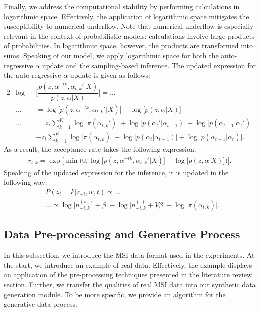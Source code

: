 \documentclass{mpaper}
\begin{document}
\par Finally, we address the computational stability by performing calculations in logarithmic space. Effectively, the application of logarithmic space mitigates the susceptibility to numerical underflow. Note that numerical underflow is especially relevant in the context of probabilistic models: calculations involve large products of probabilities. In logarithmic space, however, the products are transformed into sums. Speaking of our model, we apply logarithmic space for both the auto-regressive $\alpha$ update and the sampling-based inference. The updated expression for the auto-regressive $\alpha$ update is given as follows:
\begin{alignat*}{2}
  &\log&&\bigg[{\dfrac{p(z,\alpha^{-tk},\alpha_{t, k}'|X)}{p(z,\alpha|X)}}\bigg] = \ldots \\
  & \ldots && = \log\big[{p(z,\alpha^{-tk},\alpha_{t, k}'|X)}\big] - \log\big[{p(z,\alpha|X)}\big]\\
  & \ldots && = z_{t}\sum_{k=1}^K\log\big[\pi(\alpha_{t,k}')\big] + \log\big[p(\alpha_t'|\alpha_{t-1})\big] + \log\big[p(\alpha_{t+1}|\alpha_t')\big]\\
  & && - z_{t}\sum_{k=1}^K\log\big[\pi(\alpha_{t, k})\big] + \log\big[p(\alpha_t|\alpha_{t-1})\big] + \log\big[p(\alpha_{t+1}|\alpha_t)\big].
\end{alignat*}
As a result, the acceptance rate takes the following expression:
\begin{align*}
	r_{t,k} = \exp\big[\min{\big(0, \log\big[{p(z,\alpha^{-tk},\alpha_{t, k}'|X)}\big] - \log\big[{p(z,\alpha|X)}\big]}\big)\big].
\end{align*}
Speaking of the updated expression for the inference, it is updated in the following way:
\begin{align*}
&P(z_i = k | z_{-i}, w, t) \propto \ldots\\
&\ldots \propto \log\big[n_{-i, k}^{(w_i)} + \beta\big] - \log\big[n_{-i, k}^{(\cdot)} + V\beta\big] + \log\big[\pi(\alpha_{t,k})\big].
\end{align*}

\subsection{Data Pre-processing and Generative Process}

\par In this subsection, we introduce the MSI data format used in the experiments. At the start, we introduce an example of real data. Effectively, the example displays an application of the pre-processing techniques presented in the literature review section. Further, we transfer the qualities of real MSI data into our synthetic data generation module. To be more specific, we provide an algorithm for the generative data process.
\end{document}
